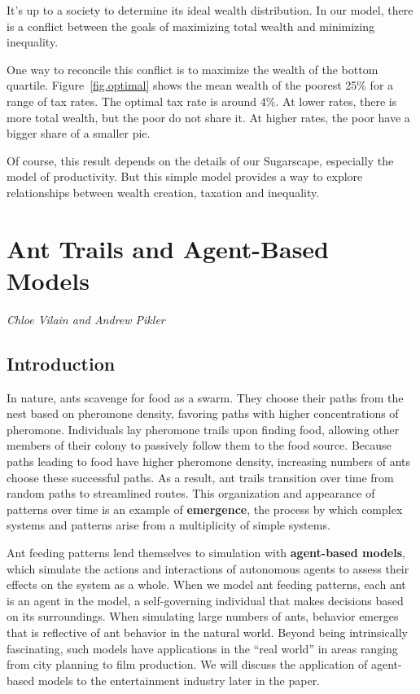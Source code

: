 \documentclass[10pt]{book}
\begin{document}
It's up to a society to determine its ideal wealth distribution. 
In our model, there is a conflict between the goals of maximizing
total wealth and minimizing inequality.

One way to reconcile this conflict is to maximize the wealth of
the bottom quartile.  Figure~\ref{fig.optimal} shows the mean
wealth of the poorest 25\% for a range of tax rates.  The optimal
tax rate is around 4\%.  At lower rates, there is more total
wealth, but the poor do not share it.  At higher rates, the poor
have a bigger share of a smaller pie.

Of course, this result depends on the details of our Sugarscape,
especially the model of productivity.  But this simple model
provides a way to explore relationships between wealth creation,
taxation and inequality.



\chapter{Ant Trails and Agent-Based Models}

{\em Chloe Vilain and Andrew Pikler}

\section{Introduction}

In nature, ants scavenge for food as a swarm. They choose their paths
from the nest based on pheromone density, favoring paths with higher
concentrations of pheromone.  Individuals lay pheromone trails upon
finding food, allowing other members of their colony to passively
follow them to the food source.  Because paths leading to food have
higher pheromone density, increasing numbers of ants choose these
successful paths.  As a result, ant trails transition over time from
random paths to streamlined routes.  This organization and appearance
of patterns over time is an example of \textbf{emergence}, the process
by which complex systems and patterns arise from a multiplicity of
simple systems.

Ant feeding patterns lend themselves to simulation with
\textbf{agent-based models}, which simulate the actions and
interactions of autonomous agents to assess their effects on the
system as a whole.  When we model ant feeding patterns, each ant is an
agent in the model, a self-governing individual that makes decisions
based on its surroundings.  When simulating large numbers of ants,
behavior emerges that is reflective of ant behavior in the natural
world.  Beyond being intrinsically fascinating, such models have
applications in the ``real world'' in areas ranging from city planning
to film production.  We will discuss the application of agent-based
models to the entertainment industry later in the paper.
\end{document}
